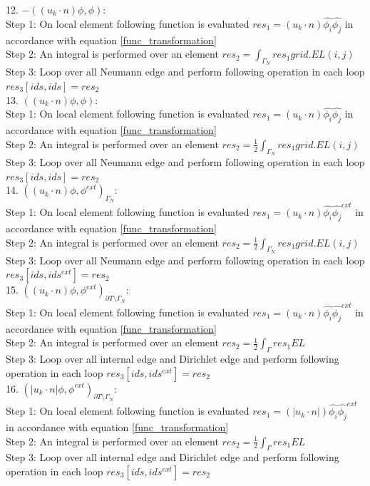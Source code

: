 \documentclass[a4paper,12pt]{book}
\begin{document}
12. $-((u_k \cdot n)\phi , \phi)$:\\
Step 1: On local element following function is evaluated $res_1 = (u_k \cdot n) \hat{\phi_i} \hat{\phi_j} $ in accordance with equation \ref{func_transformation}\\
Step 2: An integral is performed over an element $res_2= \int_{\Gamma_N} res_1 grid.EL(i,j) $\\
Step 3: Loop over all Neumann edge and perform following operation in each loop $res_3[ids,ids]=res_2$\\

13. $((u_k \cdot n)\phi , \phi)$:\\
Step 1: On local element following function is evaluated $res_1 = (u_k \cdot n) \hat{\phi_i} \hat{\phi_j} $ in accordance with equation \ref{func_transformation}\\
Step 2: An integral is performed over an element $res_2 = \frac{1}{2}  \int_{\Gamma_N} res_1 grid.EL(i,j) $\\
Step 3: Loop over all Neumann edge and perform following operation in each loop $res_3[ids,ids] = res_2$\\

14. $((u_k \cdot n)\phi,\phi^{ext})_{\Gamma_N}$:\\
Step 1: On local element following function is evaluated $res_1 = (u_k \cdot n) \hat{\phi_i} \hat{\phi_j}^{ext} $ in accordance with equation \ref{func_transformation}\\
Step 2: An integral is performed over an element $res_2 = \frac{1}{2} \int_{\Gamma_N} res_1 grid.EL(i,j) $\\
Step 3: Loop over all Neumann edge and perform following operation in each loop $res_3[ids,ids^{ext}] = res_2$\\

15. $((u_k \cdot n)\phi,\phi^{ext})_{\partial T \setminus \Gamma_N}$:\\
Step 1: On local element following function is evaluated $res_1 = (u_k \cdot n) \hat{\phi_i} \hat{\phi_j}^{ext} $ in accordance with equation \ref{func_transformation}\\
Step 2: An integral is performed over an element $res_2 = \frac{1}{2} \int_{\Gamma} res_1 EL $\\
Step 3: Loop over all internal edge and Dirichlet edge and perform following operation in each loop $res_3[ids,ids^{ext}] = res_2$\\

16. $(|u_k \cdot n| \phi,\phi^{ext})_{\partial T \setminus \Gamma_N}$:\\
Step 1: On local element following function is evaluated $res_1 = (|u_k \cdot n|) \hat{\phi_i} \hat{\phi_j}^{ext} $ in accordance with equation \ref{func_transformation}\\
Step 2: An integral is performed over an element $res_2 = \frac{1}{2} \int_{\Gamma} res_1 EL $\\
Step 3: Loop over all internal edge and Dirichlet edge and perform following operation in each loop $res_3[ids,ids^{ext}] = res_2$\\
\end{document}
